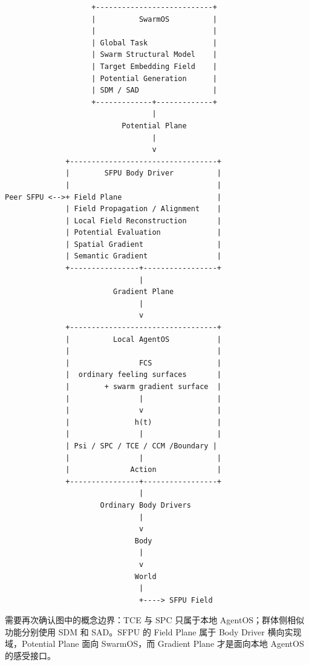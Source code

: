 \begin{verbatim}
                    +---------------------------+
                    |          SwarmOS          |
                    |                           |
                    | Global Task               |
                    | Swarm Structural Model    |
                    | Target Embedding Field    |
                    | Potential Generation      |
                    | SDM / SAD                 |
                    +-------------+-------------+
                                  |
                           Potential Plane
                                  |
                                  v
              +----------------------------------+
              |        SFPU Body Driver          |
              |                                  |
Peer SFPU <-->+ Field Plane                      |
              | Field Propagation / Alignment    |
              | Local Field Reconstruction       |
              | Potential Evaluation             |
              | Spatial Gradient                 |
              | Semantic Gradient                |
              +----------------+-----------------+
                               |
                         Gradient Plane
                               |
                               v
              +----------------------------------+
              |          Local AgentOS           |
              |                                  |
              |                FCS               |
              |  ordinary feeling surfaces       |
              |        + swarm gradient surface  |
              |                |                 |
              |                v                 |
              |               h(t)               |
              |                |                 |
              | Psi / SPC / TCE / CCM /Boundary |
              |                |                 |
              |              Action              |
              +----------------+-----------------+
                               |
                      Ordinary Body Drivers
                               |
                               v
                              Body
                               |
                               v
                              World
                               |
                               +----> SFPU Field
\end{verbatim}

需要再次确认图中的概念边界：TCE 与 SPC 只属于本地 AgentOS；群体侧相似功能分别使用 SDM 和 SAD。SFPU 的 Field Plane 属于 Body Driver 横向实现域，Potential Plane 面向 SwarmOS，而 Gradient Plane 才是面向本地 AgentOS 的感受接口。


